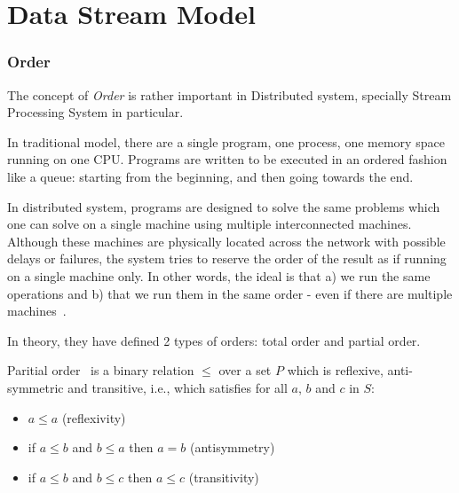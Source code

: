 
\chapter{Data Stream Model}

\ifpdf
    \graphicspath{{Chapter2/Figs/Raster/}{Chapter2/Figs/PDF/}{Chapter2/Figs/}}
\else
    \graphicspath{{Chapter2/Figs/Vector/}{Chapter2/Figs/}}
\fi


\subsection*{Order}
The concept of \textit{Order} is rather important in Distributed system, specially Stream Processing System in particular. 

In traditional model, there are a single program, one process, one memory space running on one CPU. Programs are written to be executed in an ordered fashion like a queue:  starting from the beginning, and then going towards the end. 

In distributed system, programs are designed to solve the same problems which one can solve on a single machine using multiple interconnected machines. Although these machines are physically located across the network with possible delays or failures, the system tries to reserve the order of the result as if running on a single machine only. In other words, the ideal is that a) we run the same operations and b) that we run them in the same order - even if there are multiple machines~\citep{Mikito:2014}.

In theory, they have defined 2 types of orders: total order and partial order. 

\begin{defi}
 Paritial order~\citep{Simovici:2008} is a binary relation $\leq$ over a set $P$ which is reflexive, anti-symmetric and transitive, i.e., which satisfies for all $a$, $b$ and $c$ in $S$:
 
 \begin{itemize}
	 \item $a \leq a$ (reflexivity)
	\item  if $a \leq b$ and $b \leq a$ then $a = b$ (antisymmetry) 
	\item if $a \leq b$ and $b \leq c$ then $a \leq c$  (transitivity)
\end{itemize}
\end{defi}

